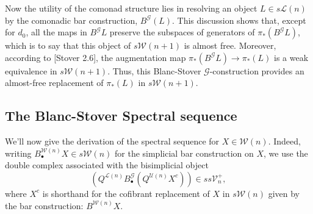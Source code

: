 \documentclass[11pt]{amsart}
\theoremstyle{plain}
\theoremstyle{definition}
\renewcommand{\to}{\longrightarrow}
\newcommand{\scrG}{\mathscr{G}}
\newcommand{\calW}{\mathcal{W}}
\newcommand{\calU}{\mathcal{U}}
\newcommand{\calL}{\mathcal{L}}
\newcommand{\calV}{\mathcal{V}}
\theoremstyle{plain}
\newcommand{\vect}[2]{\calV^{#1}_{#2}}
\newcommand{\BSW}{{\scrG}}
\begin{document}
\begin{comp func sseq old version}
Now the utility of the comonad structure lies in resolving an object $L\in s\calL(n)$ by the comonadic bar construction, $B^\BSW(L)$. This discussion shows that, except for $d_0$, all the maps in $B^\BSW L$ preserve the subspaces of generators of $\pi_*(B^\BSW L)$, which is to say that this object of $s\calW(n+1)$ is almost free. Moreover, according to [Stover 2.6], the augmentation map $\pi_*(B^\BSW L)\to \pi_*(L)$ is a weak equivalence in $s\calW(n+1)$. Thus, this Blanc-Stover $\BSW $-construction provides an almost-free replacement of $\pi_*(L)$ in $s\calW(n+1)$.
%
%
%
%
%
%
%
%
%


\subsection{The Blanc-Stover Spectral sequence}
We'll now give the derivation of the spectral sequence for $X\in\calW(n)$. Indeed, writing $B^{\calW(n)}_{\bullet}X\in s\calW(n)$ for the simplicial bar construction on $X$, we use the double complex associated with the bisimplicial object
\[(Q^{\calL(n)}B^\BSW_{\bullet}(Q^{\calU(n)}X^c))\in ss\vect{+}{n},\]
where $X^c$ is shorthand for the cofibrant replacement of $X$ in $s\calW(n)$ given by the bar construction: $B^{\calW(n)}X$.










\end{comp func sseq old version}
\end{document}
